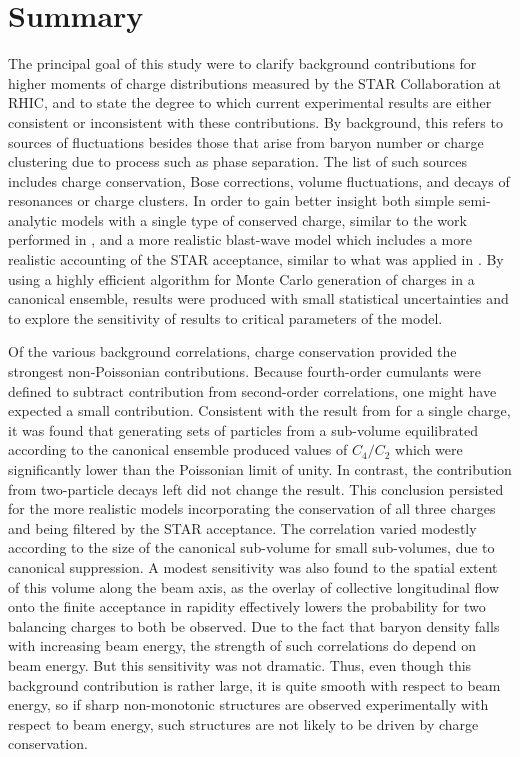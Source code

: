
\section{Summary}\label{sec:summary}
 
The principal goal of this study were to clarify background contributions for higher moments of charge distributions measured by the STAR Collaboration at RHIC, and to state the degree to which current experimental results are either consistent or inconsistent with these contributions. By background, this refers to sources of fluctuations besides those that arise from baryon number or charge clustering due to process such as phase separation. The list of such sources includes charge conservation, Bose corrections, volume fluctuations, and decays of resonances or charge clusters. In order to gain better insight both simple semi-analytic models with a single type of conserved charge, similar to the work performed in \cite{Savchuk:2019xfg}, and a more realistic blast-wave model which includes a more realistic accounting of the STAR acceptance, similar to what was applied in \cite{Oliinychenko:2020cmr}. By using a highly efficient algorithm for Monte Carlo generation of charges in a canonical ensemble, results were produced with small statistical uncertainties and to explore the sensitivity of results to critical parameters of the model.

Of the various background correlations, charge conservation provided the strongest non-Poissonian contributions. Because fourth-order cumulants were defined to subtract contribution from second-order correlations, one might have expected a small contribution. Consistent with the result from \cite{Savchuk:2019xfg} for a single charge, it was found that generating sets of particles from a sub-volume equilibrated according to the canonical ensemble produced values of $C_4/C_2$ which were significantly lower than the Poissonian limit of unity. In contrast, the contribution from two-particle decays left did not change the result. This conclusion persisted for the more realistic models incorporating the conservation of all three charges and being filtered by the STAR acceptance. The correlation varied modestly according to the size of the canonical sub-volume for small sub-volumes, due to canonical suppression. A modest sensitivity was also found to the spatial extent of this volume along the beam axis, as the overlay of collective longitudinal flow onto the finite acceptance in rapidity effectively lowers the probability for two balancing charges to both be observed. Due to the fact that baryon density falls with increasing beam energy, the strength of such correlations do depend on beam energy. But this sensitivity was not dramatic. Thus, even though this background contribution is rather large, it is quite smooth with respect to beam energy, so if sharp non-monotonic structures are observed experimentally with respect to beam energy, such structures are not likely to be driven by charge conservation. 

